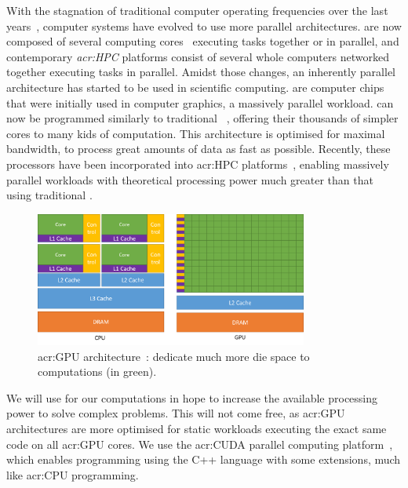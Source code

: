 With the stagnation of traditional computer \textit{} operating frequencies over
the last years~\cite{Parkhurst2006}, computer systems have evolved to use more parallel
architectures.  are now composed of several computing cores~\cite{Nayfeh1997}
executing tasks together or in parallel, and contemporary \textit{\acrfull{acr:HPC}} platforms
consist of several whole computers networked together executing tasks in parallel. Amidst those
changes, an inherently parallel architecture has started to be used in scientific computing.
\textit{} are computer chips that were initially used in computer graphics, a
massively parallel workload.  can now be programmed similarly to traditional
~\cite{Owens2008}, offering their thousands of simpler cores to many kids of
computation. This architecture is optimised for maximal bandwidth, to process great amounts of data
as fast as possible. Recently, these processors have been incorporated into \acrshort{acr:HPC}
platforms~\cite{Fan2004}, enabling massively parallel workloads with theoretical processing power
much greater than that using traditional .

\begin{figure}[H]
	\centering
	\includegraphics[width=0.8\textwidth]{Chapter_introduction/media/gpu-devotes-more-transistors-to-data-processing}
	\caption{\Acrshort{acr:GPU} architecture~\cite{Nvidia2021}:  dedicate much more die space to computations (in green).}\label{fig:intro_gpu}
\end{figure}

We will use  for our computations in hope to increase the available processing
power to solve complex problems. This will not come free, as \acrshort{acr:GPU} architectures are
more optimised for static workloads executing the exact same code on all \acrshort{acr:GPU} cores.
We use the \acrshort{acr:CUDA} parallel computing platform~\cite{Garland2008}, which enables
programming  using the C++ language with some extensions, much like
\acrshort{acr:CPU} programming.


